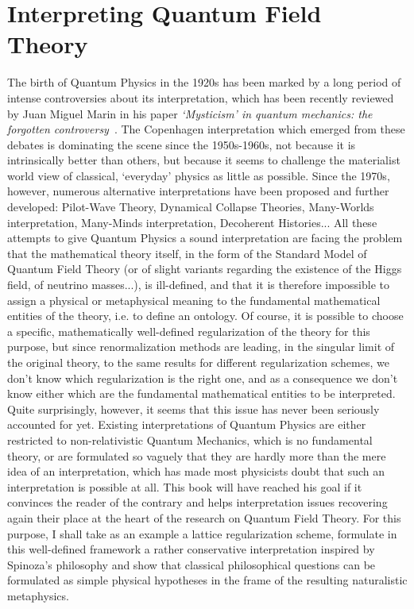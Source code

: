 \documentclass[10pt,a4paper,twoside,openany]{book}
\begin{document}
\section*{Interpreting Quantum Field Theory}

The birth of Quantum Physics in the 1920s has been marked by a long period of intense controversies about its interpretation, which has been recently reviewed by Juan Miguel Marin in his paper \textit{‘Mysticism’ in quantum mechanics: the forgotten controversy}~\cite{Marin2009}. The Copenhagen interpretation which emerged from these debates is dominating the scene since the 1950s-1960s, not because it is intrinsically better than others, but because it seems to challenge the materialist world view of classical, `everyday' physics as little as possible. Since the 1970s, however, numerous alternative interpretations have been proposed and further developed: Pilot-Wave Theory, Dynamical Collapse Theories, Many-Worlds interpretation, Many-Minds interpretation, Decoherent Histories... All these attempts to give Quantum Physics a sound interpretation are facing the problem that the mathematical theory itself, in the form of the Standard Model of Quantum Field Theory (or of slight variants regarding the existence of the Higgs field, of neutrino masses...), is ill-defined, and that it is therefore impossible to assign a physical or metaphysical meaning to the fundamental mathematical entities of the theory, i.e. to define an ontology. Of course, it is possible to choose a specific, mathematically well-defined regularization of the theory for this purpose, but since renormalization methods are leading, in the singular limit of the original theory, to the same results for different regularization schemes, we don't know which regularization is the right one, and as a consequence we don't know either which are the fundamental mathematical entities to be interpreted. Quite surprisingly, however, it seems that this issue has never been seriously accounted for yet. Existing interpretations of Quantum Physics are either restricted to non-relativistic Quantum Mechanics, which is no fundamental theory, or are formulated so vaguely that they are hardly more than the mere idea of an interpretation, which has made most physicists doubt that such an interpretation is possible at all. This book will have reached his goal if it convinces the reader of the contrary and helps interpretation issues recovering again their place at the heart of the research on Quantum Field Theory. For this purpose, I shall take as an example a lattice regularization scheme, formulate in this well-defined framework a rather conservative interpretation inspired by Spinoza's philosophy and show that classical philosophical questions can be formulated as simple physical hypotheses in the frame of the resulting naturalistic metaphysics.
\end{document}
